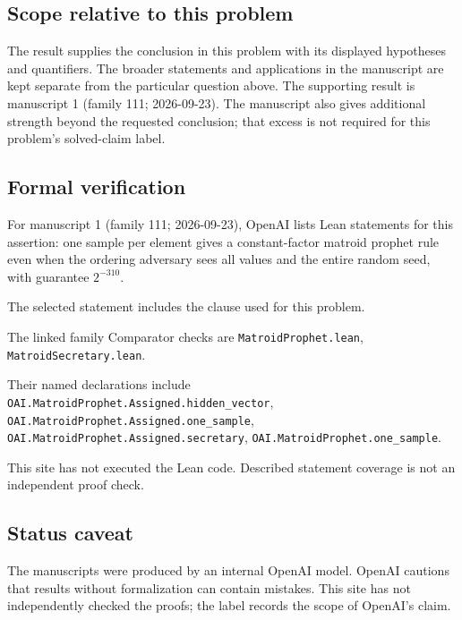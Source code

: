 \documentclass[11pt]{article}
\begin{document}
\subsection{Scope relative to this problem}
The result supplies the conclusion in this problem with its displayed hypotheses and quantifiers. The broader statements and applications in the manuscript are kept separate from the particular question above. The supporting result is manuscript 1 (family 111; 2026-09-23). The manuscript also gives additional strength beyond the requested conclusion; that excess is not required for this problem's solved-claim label.

\subsection{Formal verification}
For manuscript 1 (family 111; 2026-09-23), OpenAI lists Lean statements for this assertion: one sample per element gives a constant-factor matroid prophet rule even when the ordering adversary sees all values and the entire random seed, with guarantee $2^{-310}$.

The selected statement includes the clause used for this problem.

The linked family Comparator checks are \texttt{MatroidProphet.lean}, \texttt{MatroidSecretary.lean}.

Their named declarations include \texttt{OAI.MatroidProphet.Assigned.hidden\_vector}, \texttt{OAI.MatroidProphet.Assigned.one\_sample}, \texttt{OAI.MatroidProphet.Assigned.secretary}, \texttt{OAI.MatroidProphet.one\_sample}.

This site has not executed the Lean code. Described statement coverage is not an independent proof check.

\subsection{Status caveat}
The manuscripts were produced by an internal OpenAI model. OpenAI cautions that results without formalization can contain mistakes. This site has not independently checked the proofs; the label records the scope of OpenAI's claim.
\end{document}
